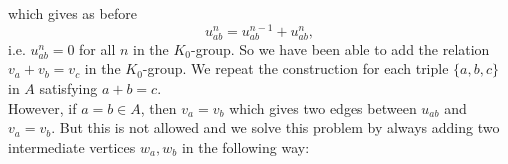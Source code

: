 \documentclass[a4paper,11pt,reqno]{amsart}
\newcommand {\edge}[2] {\draw [->] (#1) -- ($ (#1) ! .5 ! (#2) $); \draw[] ($ (#1) ! .5 ! (#2) $) -- (#2); }
\newcommand {\labelpoint} [4] {\filldraw [fill = white] (#1) node[xshift = #2pt, yshift = #3pt] {$#4$} circle (1.5pt);}
\theoremstyle{plain}
\theoremstyle{named}
\numberwithin{equation}{section}
\begin{document}
                            which gives as before 
                            \begin{displaymath}
                                u^{n}_{ab}=u^{n-1}_{ab}+u^{n}_{ab},
                            \end{displaymath}
                            i.e. $u_{ab}^{n}=0$ for all $n$ in the $K_{0}$-group. So we have been able to add the relation $v_{a}+v_{b}=v_{c}$ in the $K_{0}$-group. We repeat the construction for each triple $\{a,b,c\}$ in $A$ satisfying $a+b=c$.\\
                            \indent However, if $a=b\in A$, then $v_{a}=v_{b}$ which gives two edges between $u_{ab}$ and $v_{a}=v_{b}$. But this is not allowed and we solve this problem by always adding two intermediate vertices $w_{a}, w_{b}$ in the following way:
\begin {center}
\end {center}
\end{document}
